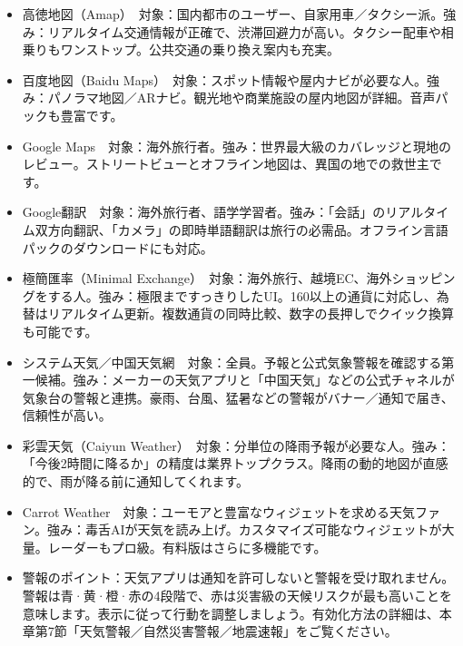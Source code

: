 
\begin{itemize}
  \item 高徳地図（Amap）　対象：国内都市のユーザー、自家用車／タクシー派。強み：リアルタイム交通情報が正確で、渋滞回避力が高い。タクシー配車や相乗りもワンストップ。公共交通の乗り換え案内も充実。
  \item 百度地図（Baidu Maps）　対象：スポット情報や屋内ナビが必要な人。強み：パノラマ地図／ARナビ。観光地や商業施設の屋内地図が詳細。音声パックも豊富です。
  \item Google Maps　対象：海外旅行者。強み：世界最大級のカバレッジと現地のレビュー。ストリートビューとオフライン地図は、異国の地での救世主です。
\end{itemize}


\begin{itemize}
  \item Google翻訳　対象：海外旅行者、語学学習者。強み：「会話」のリアルタイム双方向翻訳、「カメラ」の即時単語翻訳は旅行の必需品。オフライン言語パックのダウンロードにも対応。
\end{itemize}


\begin{itemize}
  \item 極簡匯率（Minimal Exchange）　対象：海外旅行、越境EC、海外ショッピングをする人。強み：極限まですっきりしたUI。160以上の通貨に対応し、為替はリアルタイム更新。複数通貨の同時比較、数字の長押しでクイック換算も可能です。
\end{itemize}


\begin{itemize}
  \item システム天気／中国天気網　対象：全員。予報と公式気象警報を確認する第一候補。強み：メーカーの天気アプリと「中国天気」などの公式チャネルが気象台の警報と連携。豪雨、台風、猛暑などの警報がバナー／通知で届き、信頼性が高い。
  \item 彩雲天気（Caiyun Weather）　対象：分単位の降雨予報が必要な人。強み：「今後2時間に降るか」の精度は業界トップクラス。降雨の動的地図が直感的で、雨が降る前に通知してくれます。
  \item Carrot Weather　対象：ユーモアと豊富なウィジェットを求める天気ファン。強み：毒舌AIが天気を読み上げ。カスタマイズ可能なウィジェットが大量。レーダーもプロ級。有料版はさらに多機能です。
  \item 警報のポイント：天気アプリは通知を許可しないと警報を受け取れません。警報は青·黄·橙·赤の4段階で、赤は災害級の天候リスクが最も高いことを意味します。表示に従って行動を調整しましょう。有効化方法の詳細は、本章第7節「天気警報／自然災害警報／地震速報」をご覧ください。
\end{itemize}


